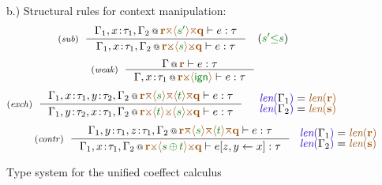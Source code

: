 \begin{figure}[t]
\vspace{1em}
{\small b.) Structural rules for context manipulation:}
\begin{equation*}
\tyrule{sub}
  {\coctx{\Gamma_1,x\!:\!\tau_1,\Gamma_2}{\aclrd{\textbf{r}} \azip \alift{\cclrd{s'}} \azip \aclrd{\textbf{q}}} \vdash e : \tau}
  {\coctx{\Gamma_1,x\!:\!\tau_1,\Gamma_2}{\aclrd{\textbf{r}} \apar \alift{\cclrd{s}} \apar \aclrd{\textbf{q}}} \vdash e : \tau}
\quad
(\cclrd{s'} \cleq \cclrd{s})
\end{equation*}
\begin{equation*}
\tyrule{weak}
  {\coctx{\Gamma}{ \aclrd{\textbf{r}} } \vdash e : \tau}
  {\coctx{\Gamma,x \!:\! \tau_1}{\aclrd{\textbf{r}} \apar \alift{ \czero }} \vdash e : \tau} 
\end{equation*}
\begin{equation*}
\tyrule{exch}
  {\coctx{\Gamma_1,x\!:\!\tau_1,y\!:\!\tau_2,\Gamma_2}{\aclrd{\textbf{r}} \azip \alift{\cclrd{s}} \azip \alift{\cclrd{t}} \azip \aclrd{\textbf{q}}} \vdash e : \tau}
  {\coctx{\Gamma_1,y\!:\!\tau_2,x\!:\!\tau_1,\Gamma_2}{\aclrd{\textbf{r}} \apar \alift{\cclrd{t}} \apar \alift{\cclrd{s}} \apar \aclrd{\textbf{q}}} \vdash e : \tau}
\quad
\begin{array}{l}
 \slen{\Gamma_1} = \alen{\aclrd{\textbf{r}}}\\[-0.25em]
 \slen{\Gamma_2} = \alen{\aclrd{\textbf{s}}}
\end{array}
\end{equation*}
\begin{equation*}
\hspace{2.5em} 
\tyrule{contr}
  {\coctx{\Gamma_1,y\!:\!\tau_1,z\!:\!\tau_1,\Gamma_2}{\aclrd{\textbf{r}} \azip \alift{\cclrd{s}} \azip \alift{\cclrd{t}} \azip \aclrd{\textbf{q}}} \vdash e : \tau}
  {\coctx{\Gamma_1,x\!:\!\tau_1,\Gamma_2}{\aclrd{\textbf{r}} \apar \alift{\cclrd{s} \,\cpar\, \cclrd{t}} \apar \aclrd{\textbf{q}}} \vdash \subst{e}{z,y}{x} : \tau}
~
\begin{array}{l}
 \slen{\Gamma_1} = \alen{\aclrd{\textbf{r}}}\\[-0.25em]
 \slen{\Gamma_2} = \alen{\aclrd{\textbf{s}}}
\end{array}
\end{equation*}

\caption{Type system for the unified coeffect calculus}
\label{fig:unif-types}
\end{figure}



